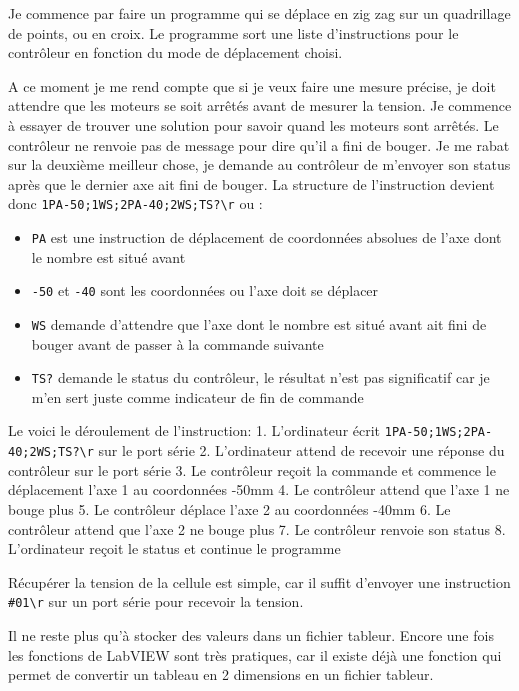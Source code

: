 \documentclass[12pt]{article}
\begin{document}
Je commence par faire un programme qui se déplace en zig zag sur un quadrillage de points, ou en croix.  
Le programme sort une liste d'instructions pour le contrôleur en fonction du mode de déplacement choisi.  

A ce moment je me rend compte que si je veux faire une mesure précise, je doit attendre que les moteurs se soit arrêtés avant de mesurer la tension.  
Je commence à essayer de trouver une solution pour savoir quand les moteurs sont arrêtés.  
Le contrôleur ne renvoie pas de message pour dire qu'il a fini de bouger.  
Je me rabat sur la deuxième meilleur chose, je demande au contrôleur de m'envoyer son status après que le dernier axe ait fini de bouger.  
La structure de l'instruction devient donc \verb|1PA-50;1WS;2PA-40;2WS;TS?\r| ou :  
\begin{itemize}
	\item \verb|PA| est une instruction de déplacement de coordonnées absolues de l'axe dont le nombre est situé avant  
	\item \verb|-50| et \verb|-40| sont les coordonnées ou l'axe doit se déplacer  
	\item \verb|WS| demande d'attendre que l'axe dont le nombre est situé avant ait fini de bouger avant de passer à la commande suivante  
	\item \verb|TS?| demande le status du contrôleur, le résultat n'est pas significatif car je m'en sert juste comme indicateur de fin de commande  
\end{itemize}
Le voici le déroulement de l'instruction:  
1. L'ordinateur écrit \verb|1PA-50;1WS;2PA-40;2WS;TS?\r| sur le port série  
2. L'ordinateur attend de recevoir une réponse du contrôleur sur le port série  
3. Le contrôleur reçoit la commande et commence le déplacement l'axe 1 au coordonnées -50mm  
4. Le contrôleur attend que l'axe 1 ne bouge plus  
5. Le contrôleur déplace l'axe 2 au coordonnées -40mm  
6. Le contrôleur attend que l'axe 2 ne bouge plus  
7. Le contrôleur renvoie son status  
8. L'ordinateur reçoit le status et continue le programme  

Récupérer la tension de la cellule est simple, car il suffit d'envoyer une instruction \verb|#01\r| sur un port série pour recevoir la tension.  

Il ne reste plus qu'à stocker des valeurs dans un fichier tableur.  
Encore une fois les fonctions de LabVIEW sont très pratiques, car il existe déjà une fonction qui permet de convertir un tableau en 2 dimensions en un fichier tableur.  
\end{document}
